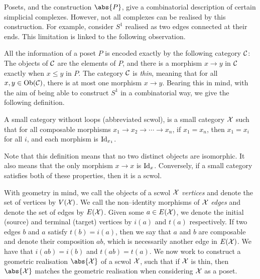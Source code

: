Posets, and the construction $\abs{P}$, give a combinatorial description of certain simplicial complexes.
However, not all complexes can be realised by this construction.
For example, consider $S^1$ realised as two edges connected at their ends.
This limitation is linked to the following observation.

All the information of a poset $P$ is encoded exactly by the following category $\mathcal{C}$:
The objects of  $\mathcal{C}$ are the elements of  $P$, and there is a morphism  $x \to y$ in  $\mathcal{C}$ exactly when  $x \leq y$ in $P$.
The category $\mathcal{C}$ is \emph{thin}, meaning that for all  $x,y \in \operatorname{Ob}(\mathcal{C})$, there is at most one morphism  $x \to y$.
Bearing this in mind, with the aim of being able to construct $S^1$ in a combinatorial way, we give the following definition.

\begin{definition}
	A small category without loops (abbreviated scwol), is a small category $\mathcal{X}$ such that for all composable morphisms $x_1 \to x_2 \to \cdots \to x_n$, if $x_1=x_n$, then $x_1=x_i$ for all $i$, and each morphism is $\operatorname{Id}_{x_1}$.
	\label{def:scwol}
\end{definition}

Note that this definition means that no two distinct objects are isomorphic.
It also means that the only morphism $x \to x$ is $\operatorname{Id}_x$.
Conversely, if a small category satisfies both of these properties, then it is a scwol.

With geometry in mind, we call the objects of a scwol $\mathcal{X}$ \emph{vertices} and denote the set of vertices by $V(\mathcal{X})$.
We call the non--identity morphisms of  $\mathcal{X}$ \emph{edges} and denote the set of edges by $E(\mathcal{X})$.
Given some $a \in E(\mathcal{X})$, we denote the initial (source) and terminal (target) vertices by $i(a)$ and $t(a)$ respectively.
If two edges $b$ and $a$ satisfy $t(b)=i(a)$, then we say that $a$ and $b$ are composable and denote their composition $ab$, which is necessarily another edge in $E(\mathcal{X})$.
We have that $i(ab) = i(b)$ and $t(ab) = t(a)$.
We now work to construct a geometric realisation $\abs{\calx}$ of a scwol $\mathcal{X}$, such that if $\mathcal{X}$ is thin, then $\abs{\calx}$ matches the geometric realisation when considering $\mathcal{X}$ as a poset.


